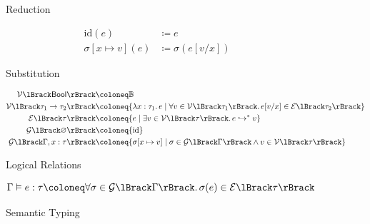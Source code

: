 \documentclass[acmsmall, screen, nonacm]{acmart}
\begin{document}
  \begin{figure}[ht]
    \caption{Reduction}
  \end{figure}

  \begin{figure}[ht]
    \begin{align*}
      \mathrm{id}(e) &\coloneq e \\
      \sigma[x \mapsto v](e) &\coloneq \sigma(e[v/x])
    \end{align*}
    \caption{Substitution}
  \end{figure}

  \begin{figure}[ht]
    \begin{align*}
      \mathcal{V}\lBrack\mathsf{Bool}\rBrack &\coloneq \mathbb{B} \\
      \mathcal{V}\lBrack\tau_1 \to \tau_2\rBrack &\coloneq \{\lambda x : \tau_1\ldotp e \mid \forall v \in \mathcal{V}\lBrack\tau_1\rBrack\ldotp e[v / x] \in \mathcal{E}\lBrack\tau_2\rBrack\} \\
      \mathcal{E}\lBrack\tau\rBrack &\coloneq \{e \mid \exists v \in \mathcal{V}\lBrack\tau\rBrack\ldotp e \hookrightarrow^* v\} \\
      \mathcal{G}\lBrack\varnothing\rBrack &\coloneq \{\mathrm{id}\} \\
      \mathcal{G}\lBrack\Gamma, x : \tau\rBrack &\coloneq \{\sigma[x \mapsto v] \mid \sigma \in \mathcal{G}\lBrack\Gamma\rBrack \land v \in \mathcal{V}\lBrack\tau\rBrack\} \\
    \end{align*}
    \caption{Logical Relations}
  \end{figure}

  \begin{figure}[ht]
    \[
      \Gamma \vDash e : \tau \coloneq \forall \sigma \in \mathcal{G}\lBrack\Gamma\rBrack\ldotp\sigma(e) \in \mathcal{E}\lBrack\tau\rBrack
    \]
    \caption{Semantic Typing}
  \end{figure}
\end{document}
